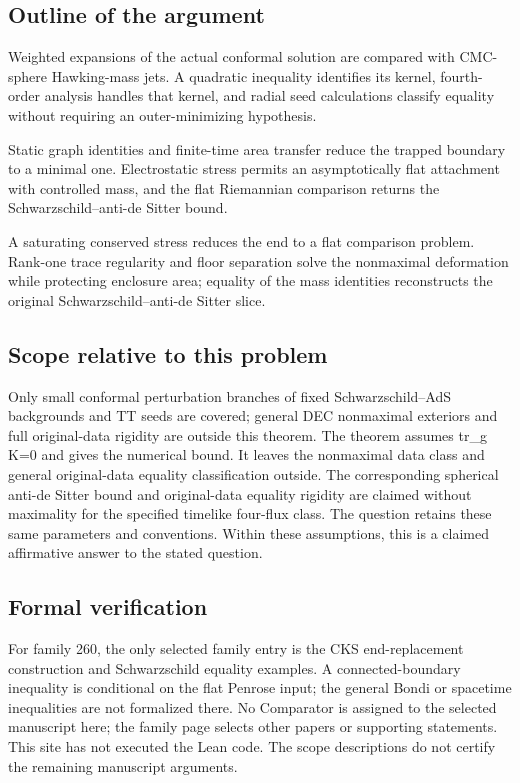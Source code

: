 \documentclass[11pt]{article}
\begin{document}
\subsection{Outline of the argument}
Weighted expansions of the actual conformal solution are compared with CMC-sphere Hawking-mass jets. A quadratic inequality identifies its kernel, fourth-order analysis handles that kernel, and radial seed calculations classify equality without requiring an outer-minimizing hypothesis.

Static graph identities and finite-time area transfer reduce the trapped boundary to a minimal one. Electrostatic stress permits an asymptotically flat attachment with controlled mass, and the flat Riemannian comparison returns the Schwarzschild--anti-de Sitter bound.

A saturating conserved stress reduces the end to a flat comparison problem. Rank-one trace regularity and floor separation solve the nonmaximal deformation while protecting enclosure area; equality of the mass identities reconstructs the original Schwarzschild--anti-de Sitter slice.

\subsection{Scope relative to this problem}
Only small conformal perturbation branches of fixed Schwarzschild–AdS backgrounds and TT seeds are covered; general DEC nonmaximal exteriors and full original-data rigidity are outside this theorem. The theorem assumes tr\_g K=0 and gives the numerical bound. It leaves the nonmaximal data class and general original-data equality classification outside. The corresponding spherical anti-de Sitter bound and original-data equality rigidity are claimed without maximality for the specified timelike four-flux class. The question retains these same parameters and conventions. Within these assumptions, this is a claimed affirmative answer to the stated question.

\subsection{Formal verification}
For family 260, the only selected family entry is the CKS end-replacement construction and Schwarzschild equality examples. A connected-boundary inequality is conditional on the flat Penrose input; the general Bondi or spacetime inequalities are not formalized there. No Comparator is assigned to the selected manuscript here; the family page selects other papers or supporting statements. This site has not executed the Lean code. The scope descriptions do not certify the remaining manuscript arguments.
\end{document}
